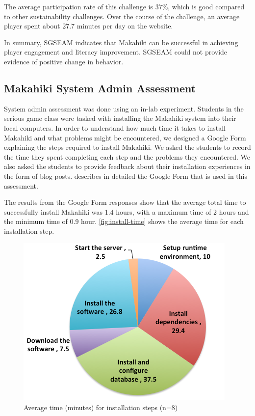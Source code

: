 \documentclass{sigchi}
\begin{document}
The average participation rate of this challenge is 37\%, which is good compared to other
sustainability challenges. Over the course of the challenge, an average player spent about
27.7 minutes per day on the website.

In summary, SGSEAM indicates that Makahiki can be successful in achieving
player engagement and literacy improvement. SGSEAM could not provide evidence of positive change in
behavior.

\subsection{Makahiki System Admin Assessment}

System admin assessment was done using an in-lab experiment.  Students in
the serious game class were tasked with installing the Makahiki system into their local
computers. In order to understand how much time it takes to install Makahiki and what
problems might be encountered, we designed a Google Form explaining the steps required to
install Makahiki. We asked the students to record the time they spent completing each step
and the problems they encountered. We also asked the students to provide feedback about
their installation experiences in the form of blog posts. \cite{csdl2-13-04} describes in detailed
the Google Form that is used in this assessment.

The results from the Google Form responses show that the average total time to successfully install
Makahiki was 1.4 hours, with a maximum time of 2 hours and the minimum time of 0.9 hour.
\autoref{fig:install-time} shows the average time for each installation step.

\begin{figure}
  \center
  \includegraphics[width=0.6\columnwidth]{install-time}
  \caption{Average time (minutes) for installation steps (n=8)}
  \label{fig:install-time}
\end{figure}
\end{document}
